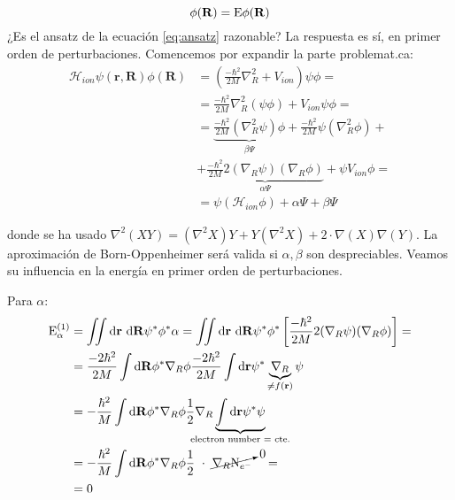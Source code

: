 \begin{equation}
  [\mathcal{H}_{ion}+\varepsilon _{el}(\mathbf{R})]\phi(\mathbf{R}) = \text E \phi(\mathbf{R})
\end{equation}
¿Es el ansatz de la ecuación \ref{eq:ansatz} razonable? La respuesta
es sí, en primer orden de perturbaciones. Comencemos por expandir la
parte problemat.ca:
\begin{equation}
  \begin{split}
    \mathcal{H}_{ion} \psi(\mathbf{r},\mathbf{R})\phi(\mathbf{R}) &= \left( \frac{-\hbar^2}{2M} \nabla^2_R + V _{ion} \right) \psi \phi = \\
    &= \frac{-\hbar^2}{2M}\nabla_R^2 (\psi\phi) + V _{ion} \psi \phi = \\
    &= \underbrace{\frac{-\hbar^2}{2M} \left( \nabla_R^2 \psi \right)
      \phi}_{\beta \Psi} +\frac{-\hbar^2}{2M} \psi \left( \nabla_R^2
      \phi \right)  + \\ & +
    \underbrace{\frac{-\hbar^2}{2M}2(\nabla_R  \psi)(\nabla_R
      \phi)}_{\alpha \Psi}+\psi V _{ion}\phi = \\
    &=\psi (\mathcal{H}_{ion}\phi) + \alpha \Psi + \beta \Psi
  \end{split}
\end{equation}

donde se ha usado
$\nabla^2 (XY) = (\nabla^2X)Y+Y(\nabla^2X)+2\cdot \nabla (X)\nabla
(Y)$.
La aproximación de Born-Oppenheimer será valida si $\alpha, \beta$ son
despreciables. Veamos su influencia en la energía en primer orden de
perturbaciones.

Para $\alpha$:
\begin{equation}
  \begin{split}
    \text E ^{(1)}_{\alpha} &= \iint \text{d}\mathbf{r} \ \text{d}\mathbf{R} \psi^* \phi^* \alpha =  \iint \text{d}\mathbf{r}\ \text{d}\mathbf{R}\psi^* \phi^* \left[\frac{-\hbar^2}{2M}2 (\nabla_R\psi)(\nabla_R\phi)\right] = \\
    &= \frac{-2\hbar^2}{2M} \int \text{d}\mathbf{R}\phi^* \nabla_R \phi  \frac{-2\hbar^2}{2M} \int \text{d}\mathbf{r} \psi^* \underbrace{\nabla_R}_{\neq f(\mathbf{r})} \psi \\
    &= -\frac{\hbar^2}{M} \int \text{d}\mathbf{R}\phi^* \nabla_R\phi
    \frac{1}{2}\nabla_R\underbrace{\int
      \text{d}\mathbf{r}\psi^*\psi}_{\mathclap{\text{electron number = cte.}}} \\ 
    &= -\frac{\hbar^2}{M} \int \text{d}\mathbf{R}\phi^* \nabla_R\phi \frac{1}{2} \ \cdot \  \cancelto{0}{\nabla_R \text{N}_{e^-}} \ \ \ = \\ &= 0
  \end{split}
\end{equation}

